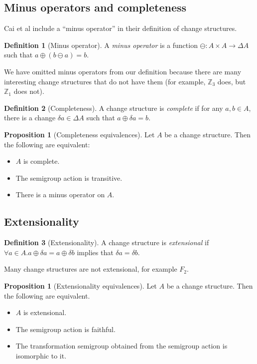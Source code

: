 \documentclass[english]{article}
\theoremstyle{plain}
\theoremstyle{definition}
\newtheorem{prop}[thm]{Proposition}
\theoremstyle{remark}
\theoremstyle{remark}
\theoremstyle{remark}
\theoremstyle{definition}
\newtheorem{defn}{Definition}
\newcommand{\cplus}{\oplus}
\newcommand{\cminus}{\ominus}
\newcommand{\changes}[1]{\Delta #1}
\newcommand{\change}[1]{\delta #1}
\begin{document}
\subsection{Minus operators and completeness}

Cai et al include a ``minus operator'' in their definition of change structures. 

\begin{defn}[Minus operator]
  A \textit{minus operator} is a function $\cminus: A \times A \rightarrow \changes{A}$
  such that $a \cplus (b \cminus a) = b$.
\end{defn}

We have omitted minus operators from our definition because
there are many interesting change structures that do not have them (for example,
$\mathbb{Z}_3$ does, but $\mathbb{Z}_1$ does not).

\begin{defn}[Completeness]
  A change structure is \textit{complete} if for any $a, b \in A$, there is
  a change $\change{a} \in \changes{A}$ such that $a \cplus \change{a} = b$.
\end{defn}

\begin{prop}[Completeness equivalences]
  Let $A$ be a change structure. Then the following are equivalent:
  \begin{itemize}
    \item $A$ is complete.
    \item The semigroup action is transitive.
    \item There is a minus operator on $A$.
  \end{itemize}
\end{prop}

\subsection{Extensionality}

\begin{defn}[Extensionality]
  A change structure is \textit{extensional} if $\forall a \in A. a \cplus \change{a}
  = a \cplus \change{b}$ implies that $\change{a} = \change{b}$.
\end{defn}

Many change structures are not extensional, for example $F_2$.

\begin{prop}[Extensionality equivalences]
  Let $A$ be a change structure. Then the following are equivalent.
  \begin{itemize}
    \item $A$ is extensional.
    \item The semigroup action is faithful.
    \item The transformation semigroup obtained from the semigroup action is
      isomorphic to it.
  \end{itemize}
\end{prop}
\end{document}

